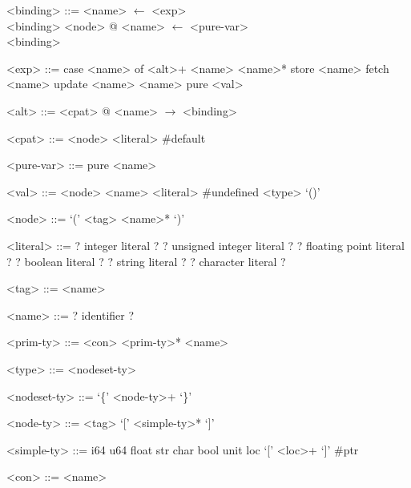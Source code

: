 \documentclass[main.tex]{subfiles}
\begin{document}
	\hspace{-0.7cm}
	\begin{minipage}{0.5\textwidth}
		\setlength{\grammarindent}{2.5cm} %
		\begin{grammar}
			
			<binding> ::= <name> $\leftarrow$ <exp> \\ <binding>
			\alt <node> @ <name> $\leftarrow$ <pure-var> \\ <binding>
			\alt <pure-var>
			
			<exp> ::= case <name> of <alt>+   
			\alt <name> <name>*
			\alt store <name>
			\alt fetch <name>
			\alt update <name> <name>
			\alt pure <val>
			
			<alt> ::= <cpat> @ <name> $\rightarrow$ <binding>
			
			<cpat> ::= <node>
			\alt \#default
			
			<pure-var> ::= pure <name>
			
			<val> ::= <node> 
			\alt <name>
			\alt \#undefined <type>
			\alt `()'
			
			<node> ::= `(' <tag> <name>* `)'
			
			<literal> ::= ? integer literal ?
			\alt ? unsigned integer literal ?
			\alt ? floating point literal ?
			\alt ? boolean literal ?
			\alt ? string literal ?
			\alt ? character literal ?
			
			<tag> ::= <name>
			
			<name> ::= ? identifier ?
			
		\end{grammar}
	\end{minipage}
	\hfill
	\begin{minipage}{0.45\textwidth}
			\vspace{-1.75cm}
		\setlength{\grammarindent}{2.75cm} %
		\begin{grammar}
			<prim-ty> ::= <con> <prim-ty>*
			\alt <name>
			\alt <simple-ty>
			
			<type> ::= <nodeset-ty>
			\alt <simple-ty>
			
			<nodeset-ty> ::= `\{' <node-ty>+ `\}'
			
			<node-ty> ::= <tag> {`['} <simple-ty>* {`]'}
	
			<simple-ty> ::= i64
			\alt u64
			\alt float
			\alt str
			\alt char
			\alt bool
			\alt unit
			\alt loc `[' <loc>+ `]'
			\alt \#ptr
			
			<con> ::= <name>
		\end{grammar}
	\end{minipage}
	
\end{document}
